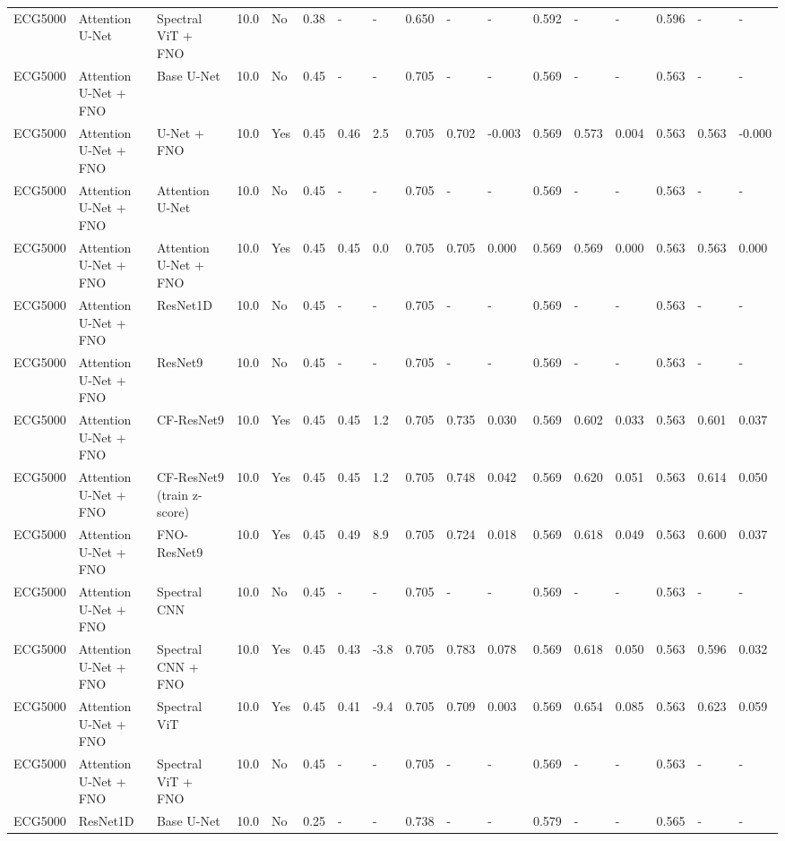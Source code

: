 \begin{longtable}{lllllllllllllllll}
ECG5000 & Attention U-Net & Spectral ViT + FNO & 10.0 & No & 0.38 & - & - & 0.650 & - & - & 0.592 & - & - & 0.596 & - & - \\
ECG5000 & Attention U-Net + FNO & Base U-Net & 10.0 & No & 0.45 & - & - & 0.705 & - & - & 0.569 & - & - & 0.563 & - & - \\
ECG5000 & Attention U-Net + FNO & U-Net + FNO & 10.0 & Yes & 0.45 & 0.46 & 2.5 & 0.705 & 0.702 & -0.003 & 0.569 & 0.573 & 0.004 & 0.563 & 0.563 & -0.000 \\
ECG5000 & Attention U-Net + FNO & Attention U-Net & 10.0 & No & 0.45 & - & - & 0.705 & - & - & 0.569 & - & - & 0.563 & - & - \\
ECG5000 & Attention U-Net + FNO & Attention U-Net + FNO & 10.0 & Yes & 0.45 & 0.45 & 0.0 & 0.705 & 0.705 & 0.000 & 0.569 & 0.569 & 0.000 & 0.563 & 0.563 & 0.000 \\
ECG5000 & Attention U-Net + FNO & ResNet1D & 10.0 & No & 0.45 & - & - & 0.705 & - & - & 0.569 & - & - & 0.563 & - & - \\
ECG5000 & Attention U-Net + FNO & ResNet9 & 10.0 & No & 0.45 & - & - & 0.705 & - & - & 0.569 & - & - & 0.563 & - & - \\
ECG5000 & Attention U-Net + FNO & CF-ResNet9 & 10.0 & Yes & 0.45 & 0.45 & 1.2 & 0.705 & 0.735 & 0.030 & 0.569 & 0.602 & 0.033 & 0.563 & 0.601 & 0.037 \\
ECG5000 & Attention U-Net + FNO & CF-ResNet9 (train z-score) & 10.0 & Yes & 0.45 & 0.45 & 1.2 & 0.705 & 0.748 & 0.042 & 0.569 & 0.620 & 0.051 & 0.563 & 0.614 & 0.050 \\
ECG5000 & Attention U-Net + FNO & FNO-ResNet9 & 10.0 & Yes & 0.45 & 0.49 & 8.9 & 0.705 & 0.724 & 0.018 & 0.569 & 0.618 & 0.049 & 0.563 & 0.600 & 0.037 \\
ECG5000 & Attention U-Net + FNO & Spectral CNN & 10.0 & No & 0.45 & - & - & 0.705 & - & - & 0.569 & - & - & 0.563 & - & - \\
ECG5000 & Attention U-Net + FNO & Spectral CNN + FNO & 10.0 & Yes & 0.45 & 0.43 & -3.8 & 0.705 & 0.783 & 0.078 & 0.569 & 0.618 & 0.050 & 0.563 & 0.596 & 0.032 \\
ECG5000 & Attention U-Net + FNO & Spectral ViT & 10.0 & Yes & 0.45 & 0.41 & -9.4 & 0.705 & 0.709 & 0.003 & 0.569 & 0.654 & 0.085 & 0.563 & 0.623 & 0.059 \\
ECG5000 & Attention U-Net + FNO & Spectral ViT + FNO & 10.0 & No & 0.45 & - & - & 0.705 & - & - & 0.569 & - & - & 0.563 & - & - \\
ECG5000 & ResNet1D & Base U-Net & 10.0 & No & 0.25 & - & - & 0.738 & - & - & 0.579 & - & - & 0.565 & - & - \\

\end{longtable}
